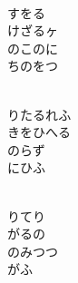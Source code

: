 \documentclass[10pt,b5j]{tarticle} %
\begin{document}
\vspace{1.5em} %
\newcommand{\linespace}{0.5em} %
\newcommand{\blocksize}{0.5\hsize} %
\newcommand{\itemmargin}{3em} %
\begin{enumerate} %
    \setlength{\itemindent}{\itemmargin} %
    \begin{minipage}[c]{\blocksize}
    
        \vspace{\linespace}
        \item~\\
        すをる\\
        けざるヶ\\
        のこのに\\
        ちのをつ
        
    \end{minipage}
    \begin{minipage}[c]{\blocksize}
        
        \vspace{\linespace}
        \item~\\
        りたるれふ\\
        きをひへる\\
        のらず\\
        にひふ
        
    \end{minipage}
    \begin{minipage}[c]{\blocksize}
        
        \vspace{\linespace}
        \item~\\
        りてり\\
        がるの\\
        のみつつ\\
        がふ
        

\end{minipage}
\end{enumerate}
\end{document}
